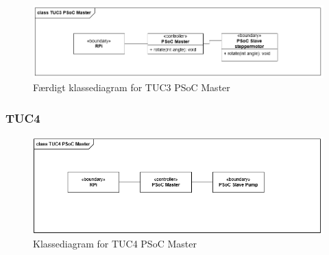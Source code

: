 \begin{figure}[H]
	\centering
	\includegraphics[width=1\textwidth]{Images/Applikationsmodeller/PSoCMaster/TUC3_cd_PSoC_Master_final.png}
	\caption{Færdigt klassediagram for TUC3 PSoC Master}
	\label{fig:cdTUC3PSoCMaster_final}
\end{figure}
\subsubsection{TUC4}
\begin{figure}[H]
	\centering
	\includegraphics[width=1\textwidth]{Images/Applikationsmodeller/PSoCMaster/TUC4_cd_PSoC_Master.png}
	\caption{Klassediagram for TUC4 PSoC Master}
	\label{fig:cdTUC4PSoCMaster}
\end{figure}

